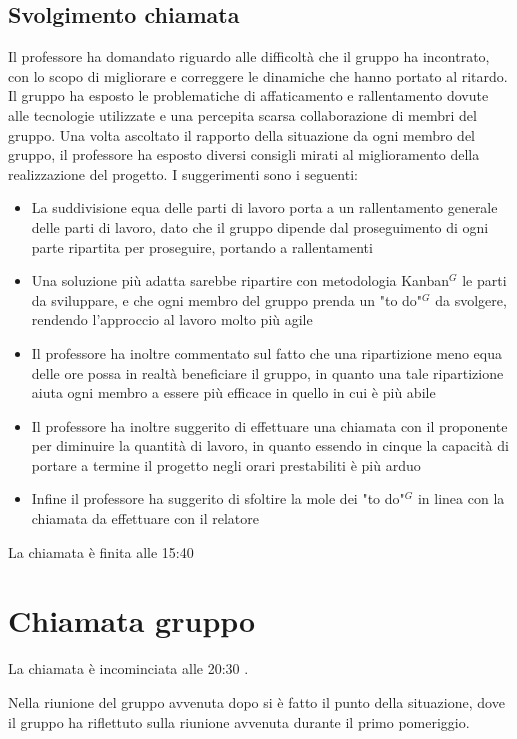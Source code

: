 \subsection{Svolgimento chiamata} 
Il professore ha domandato riguardo alle difficoltà che il gruppo ha incontrato, con lo scopo di  
migliorare e correggere le dinamiche che hanno portato al ritardo. 
Il gruppo ha esposto le problematiche di affaticamento e rallentamento dovute alle tecnologie utilizzate e  
una percepita scarsa collaborazione di membri del gruppo. \newline 
Una volta ascoltato il rapporto della situazione da ogni membro del gruppo, il professore ha esposto  
diversi consigli mirati al miglioramento della realizzazione del progetto. I suggerimenti sono i seguenti: 
\begin{itemize} 
 \item La suddivisione equa delle parti di lavoro porta a un rallentamento generale delle parti di lavoro, 
 dato che il gruppo dipende dal proseguimento di ogni parte ripartita per proseguire, portando a rallentamenti 
 \item Una soluzione più adatta sarebbe ripartire con metodologia Kanban$^{G}$ le parti da sviluppare, e che ogni  
 membro del gruppo prenda un "to do"$^{G}$ da svolgere, rendendo l'approccio al lavoro molto più agile 
 \item Il professore ha inoltre commentato sul fatto che una ripartizione meno equa delle ore possa in realtà  
 beneficiare il gruppo, in quanto una tale ripartizione aiuta ogni membro a essere 
 più efficace in quello in cui è più abile 
 \item Il professore ha inoltre suggerito di effettuare una chiamata con il proponente per diminuire la quantità di lavoro, in 
 quanto essendo in cinque la capacità di portare a termine il progetto negli orari prestabiliti è più arduo
 \item Infine il professore ha suggerito di sfoltire la mole dei "to do"$^{G}$ in linea con la chiamata da effettuare
 con il relatore 
\end{itemize} 
La chiamata è finita alle 15:40
\newpage
 
\section {Chiamata gruppo} 
La chiamata è incominciata alle 20:30 . \newline

Nella riunione del gruppo avvenuta dopo si è fatto il punto della situazione, dove il gruppo ha 
riflettuto sulla riunione avvenuta durante il primo pomeriggio. \newline 
 
